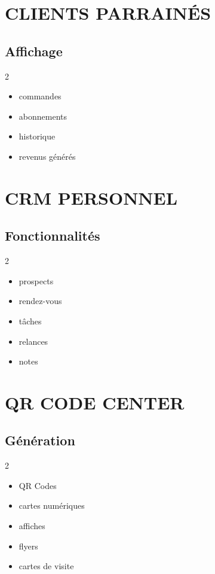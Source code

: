 \documentclass[12pt,a4paper,oneside]{book}
\begin{document}
\chapter{CLIENTS PARRAINÉS}

\section{Affichage}
\begin{multicols}{2}
\begin{itemize}
\item commandes
\item abonnements
\item historique
\item revenus générés
\end{itemize}
\end{multicols}

\chapter{CRM PERSONNEL}

\section{Fonctionnalités}
\begin{multicols}{2}
\begin{itemize}
\item prospects
\item rendez-vous
\item tâches
\item relances
\item notes
\end{itemize}
\end{multicols}

\chapter{QR CODE CENTER}

\section{Génération}
\begin{multicols}{2}
\begin{itemize}
\item QR Codes
\item cartes numériques
\item affiches
\item flyers
\item cartes de visite
\end{itemize}
\end{multicols}
\end{document}

